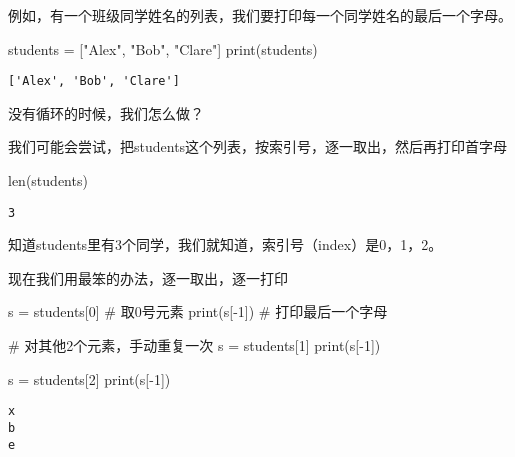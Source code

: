 \documentclass[
  letterpaper,
  DIV=11,
  numbers=noendperiod]{scrreprt}
\newenvironment{Shaded}{\begin{snugshade}}{\end{snugshade}}
\newcommand{\BuiltInTok}[1]{\textcolor[rgb]{0.00,0.23,0.31}{#1}}
\newcommand{\CommentTok}[1]{\textcolor[rgb]{0.37,0.37,0.37}{#1}}
\newcommand{\DecValTok}[1]{\textcolor[rgb]{0.68,0.00,0.00}{#1}}
\newcommand{\NormalTok}[1]{\textcolor[rgb]{0.00,0.23,0.31}{#1}}
\newcommand{\OperatorTok}[1]{\textcolor[rgb]{0.37,0.37,0.37}{#1}}
\newcommand{\StringTok}[1]{\textcolor[rgb]{0.13,0.47,0.30}{#1}}
\begin{document}
例如，有一个班级同学姓名的列表，我们要打印每一个同学姓名的最后一个字母。

\begin{Shaded}
\begin{Highlighting}[]
\NormalTok{students }\OperatorTok{=}\NormalTok{ [}\StringTok{"Alex"}\NormalTok{, }\StringTok{"Bob"}\NormalTok{, }\StringTok{"Clare"}\NormalTok{]}
\BuiltInTok{print}\NormalTok{(students)}
\end{Highlighting}
\end{Shaded}

\begin{verbatim}
['Alex', 'Bob', 'Clare']
\end{verbatim}

没有循环的时候，我们怎么做？

我们可能会尝试，把students这个列表，按索引号，逐一取出，然后再打印首字母

\begin{Shaded}
\begin{Highlighting}[]
\BuiltInTok{len}\NormalTok{(students)}
\end{Highlighting}
\end{Shaded}

\begin{verbatim}
3
\end{verbatim}

知道students里有3个同学，我们就知道，索引号（index）是0，1，2。

现在我们用最笨的办法，逐一取出，逐一打印

\begin{Shaded}
\begin{Highlighting}[]
\NormalTok{s }\OperatorTok{=}\NormalTok{ students[}\DecValTok{0}\NormalTok{]   }\CommentTok{\# 取0号元素}
\BuiltInTok{print}\NormalTok{(s[}\OperatorTok{{-}}\DecValTok{1}\NormalTok{])      }\CommentTok{\# 打印最后一个字母}

\CommentTok{\# 对其他2个元素，手动重复一次}
\NormalTok{s }\OperatorTok{=}\NormalTok{ students[}\DecValTok{1}\NormalTok{]}
\BuiltInTok{print}\NormalTok{(s[}\OperatorTok{{-}}\DecValTok{1}\NormalTok{])}

\NormalTok{s }\OperatorTok{=}\NormalTok{ students[}\DecValTok{2}\NormalTok{]}
\BuiltInTok{print}\NormalTok{(s[}\OperatorTok{{-}}\DecValTok{1}\NormalTok{])}
\end{Highlighting}
\end{Shaded}

\begin{verbatim}
x
b
e
\end{verbatim}
\end{document}
